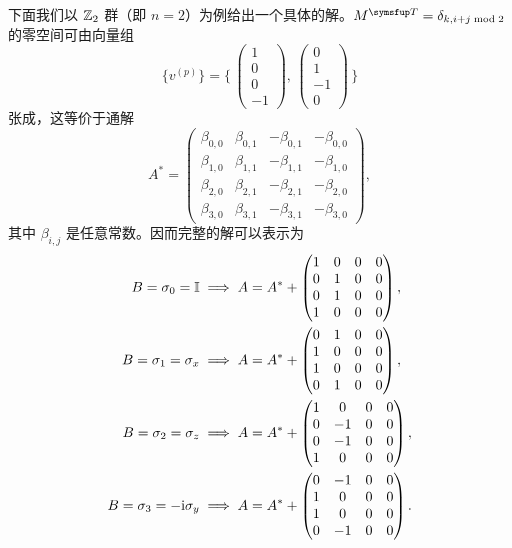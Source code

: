 下面我们以 $\mathbb{Z}_2$ 群（即 $n=2$）为例给出一个具体的解。$M^\trans=\delta_{k,i+j\bmod2}$ 的零空间可由向量组
\begin{equation}
  \{ v^{(p)} \} = \Biggl\{ \,
    \begin{pmatrix} 1 \\ 0 \\ 0 \\ -1 \end{pmatrix}, \,
    \begin{pmatrix} 0 \\ 1 \\ -1 \\ 0 \end{pmatrix} \,
  \Biggr\}
\end{equation}
张成，这等价于通解
\begin{equation}
  A^* = \begin{pmatrix}
    \beta_{0,0} & \beta_{0,1} & -\beta_{0,1} & -\beta_{0,0} \\
    \beta_{1,0} & \beta_{1,1} & -\beta_{1,1} & -\beta_{1,0} \\
    \beta_{2,0} & \beta_{2,1} & -\beta_{2,1} & -\beta_{2,0} \\
    \beta_{3,0} & \beta_{3,1} & -\beta_{3,1} & -\beta_{3,0}
  \end{pmatrix},
\end{equation}
其中 $\beta_{i,j}$ 是任意常数。因而完整的解可以表示为
\begin{equation}
  \begin{aligned}
    B = \sigma_0 = \mathbb{I} &\implies A = A^* + \begin{pmatrix}
      1 & 0 & 0 & 0 \\
      0 & 1 & 0 & 0 \\
      0 & 1 & 0 & 0 \\
      1 & 0 & 0 & 0
    \end{pmatrix}, \\
    B = \sigma_1 = \sigma_x &\implies A = A^* + \begin{pmatrix}
      0 & 1 & 0 & 0 \\
      1 & 0 & 0 & 0 \\
      1 & 0 & 0 & 0 \\
      0 & 1 & 0 & 0
    \end{pmatrix}, \\
    B = \sigma_2 = \sigma_z &\implies A = A^* + \begin{pmatrix}
      1 &  0 & 0 & 0 \\
      0 & -1 & 0 & 0 \\
      0 & -1 & 0 & 0 \\
      1 &  0 & 0 & 0
    \end{pmatrix}, \\
    B = \sigma_3 = -\mathrm{i}\sigma_y &\implies A = A^* + \begin{pmatrix}
      0 & -1 & 0 & 0 \\
      1 &  0 & 0 & 0 \\
      1 &  0 & 0 & 0 \\
      0 & -1 & 0 & 0
    \end{pmatrix}.
  \end{aligned}
  \label{eq:1+1d-z2-solution}
\end{equation}
